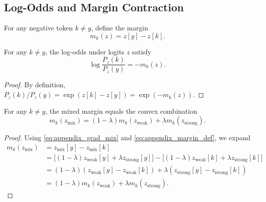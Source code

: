 \subsection{Log-Odds and Margin Contraction}
\begin{definition}
For any negative token $k \neq y$, define the margin
\begin{equation}
    m_k(z) = z[y] - z[k].
    \label{eq:appendix_margin_def}
\end{equation}
\end{definition}

\begin{lemma}
For any $k \neq y$, the log-odds under logits $z$ satisfy
\begin{equation}
    \log \frac{P_z(k)}{P_z(y)} = - m_k(z).
    \label{eq:appendix_logodds}
\end{equation}
\end{lemma}
\begin{proof}
By definition, $P_z(k) / P_z(y) = \exp(z[k] - z[y]) = \exp(-m_k(z))$.
\end{proof}

\begin{lemma}
For any $k \neq y$, the mixed margin equals the convex combination
\begin{equation}
    m_k(z_{\text{mix}}) = (1-\lambda) m_k(z_{\mathrm{weak}}) + \lambda m_k(z_{\mathrm{strong}}).
    \label{eq:appendix_margin_mix}
\end{equation}
\end{lemma}
\begin{proof}
Using \eqref{eq:appendix_grad_mix} and \eqref{eq:appendix_margin_def}, we expand
\begin{align}
    m_k(z_{\text{mix}})
    &= z_{\text{mix}}[y] - z_{\text{mix}}[k] \nonumber\\
    &= \big[(1-\lambda) z_{\mathrm{weak}}[y] + \lambda z_{\mathrm{strong}}[y]\big]
       - \big[(1-\lambda) z_{\mathrm{weak}}[k] + \lambda z_{\mathrm{strong}}[k]\big] \nonumber\\
    &= (1-\lambda)(z_{\mathrm{weak}}[y] - z_{\mathrm{weak}}[k]) + \lambda (z_{\mathrm{strong}}[y] - z_{\mathrm{strong}}[k]) \nonumber\\
    &= (1-\lambda) m_k(z_{\mathrm{weak}}) + \lambda m_k(z_{\mathrm{strong}}).
    \label{eq:appendix_margin_mix_proof}\textbf{}
\end{align}
\end{proof}

